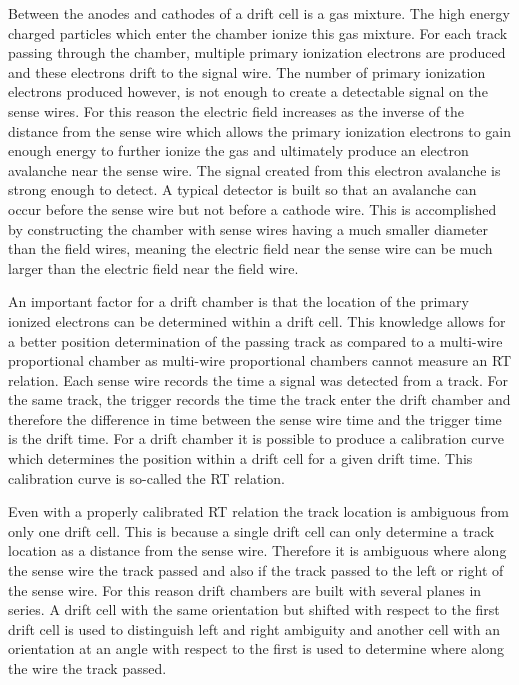 Between the anodes and cathodes of a drift cell is a gas mixture.  The high
energy charged particles which enter the chamber ionize this gas mixture.  For
each track passing through the chamber, multiple primary ionization electrons
are produced and these electrons drift to the signal wire.  The number of
primary ionization electrons produced however, is not enough to create a
detectable signal on the sense wires.  For this reason the electric field
increases as the inverse of the distance from the sense wire which allows the
primary ionization electrons to gain enough energy to further ionize the gas and
ultimately produce an electron avalanche near the sense wire.  The signal
created from this electron avalanche is strong enough to detect.  A typical
detector is built so that an avalanche can occur before the sense wire but not
before a cathode wire.  This is accomplished by constructing the chamber with
sense wires having a much smaller diameter than the field wires, meaning the
electric field near the sense wire can be much larger than the electric field
near the field wire.

An important factor for a drift chamber is that the location of the primary
ionized electrons can be determined within a drift cell.  This knowledge allows
for a better position determination of the passing track as compared to a
multi-wire proportional chamber as multi-wire proportional chambers cannot
measure an RT relation.  Each sense wire records the time a signal was detected
from a track.  For the same track, the trigger records the time the track enter
the drift chamber and therefore the difference in time between the sense wire
time and the trigger time is the drift time.  For a drift chamber it is possible
to produce a calibration curve which determines the position within a drift cell
for a given drift time.  This calibration curve is so-called the RT relation.

Even with a properly calibrated RT relation the track location is ambiguous from
only one drift cell.  This is because a single drift cell can only determine a
track location as a distance from the sense wire.  Therefore it is ambiguous
where along the sense wire the track passed and also if the track passed to the
left or right of the sense wire.  For this reason drift chambers are built with
several planes in series.  A drift cell with the same orientation but shifted
with respect to the first drift cell is used to distinguish left and right
ambiguity and another cell with an orientation at an angle with respect to the
first is used to determine where along the wire the track passed.


